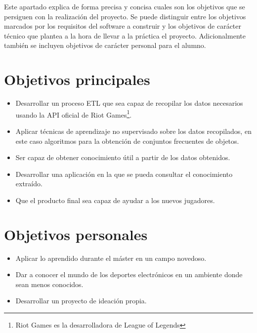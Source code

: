 
Este apartado explica de forma precisa y concisa cuales son los objetivos que se persiguen con la realización del proyecto. Se puede distinguir entre los objetivos marcados por los requisitos del software a construir y los objetivos de carácter técnico que plantea a la hora de llevar a la práctica el proyecto. Adicionalmente también se incluyen objetivos de carácter personal para el alumno.

\section{Objetivos principales}
\begin{itemize}
    \item Desarrollar un proceso ETL que sea capaz de recopilar los datos necesarios usando la API oficial de Riot Games\footnote{Riot Games es la desarrolladora de League of Legends}.
    \item Aplicar técnicas de aprendizaje no supervisado sobre los datos recopilados, en este caso algoritmos para la obtención de conjuntos frecuentes de objetos.
    \item Ser capaz de obtener conocimiento útil a partir de los datos obtenidos.
    \item Desarrollar una aplicación en la que se pueda consultar el conocimiento extraído.
    \item Que el producto final sea capaz de ayudar a los nuevos jugadores.
\end{itemize}


\section{Objetivos personales}
\begin{itemize}
    \item Aplicar lo aprendido durante el máster en un campo novedoso.
    \item Dar a conocer el mundo de los deportes electrónicos en un ambiente donde sean menos conocidos.
    \item Desarrollar un proyecto de ideación propia.
\end{itemize}